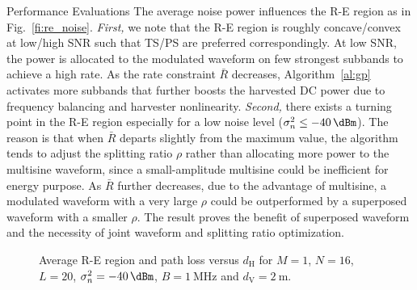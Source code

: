 \documentclass[journal]{IEEEtran}
\begin{document}
\begin{section}{Performance Evaluations}
		The average noise power influences the R-E region as in Fig.~\ref{fi:re_noise}. \textit{First,} we note that the R-E region is roughly concave/convex at low/high SNR such that TS/PS are preferred correspondingly. At low SNR, the power is allocated to the modulated waveform on few strongest subbands to achieve a high rate. As the rate constraint $\bar{R}$ decreases, Algorithm~\ref{al:gp} activates more subbands that further boosts the harvested DC power due to frequency balancing and harvester nonlinearity. \textit{Second,} there exists a turning point in the R-E region especially for a low noise level ($\sigma_n^2 \le \SI{-40}{\dBm}$). The reason is that when $\bar{R}$ departs slightly from the maximum value, the algorithm tends to adjust the splitting ratio $\rho$ rather than allocating more power to the multisine waveform, since a small-amplitude multisine could be inefficient for energy purpose. As $\bar{R}$ further decreases, due to the advantage of multisine, a modulated waveform with a very large $\rho$ could be outperformed by a superposed waveform with a smaller $\rho$. The result proves the benefit of superposed waveform and the necessity of joint waveform and splitting ratio optimization.

		\begin{figure}[!t]
			\centering
			\caption{Average R-E region and path loss versus $d_{\mathrm{H}}$ for $M=1$, $N=16$, $L=20$, $\sigma_n^2=\SI{-40}{\dBm}$, $B=\SI{1}{\MHz}$ and $d_{\mathrm{V}}=\SI{2}{\meter}$.}
		\end{figure}


\end{section}
\end{document}
